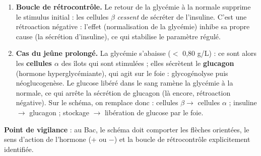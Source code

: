 \documentclass[11pt]{article}
\newcommand{\cle}[1]{{\popxbold\color{popdark}#1}}
\begin{document}
\begin{corrige}
\begin{enumerate}
\begin{popfigure}
\end{popfigure}
\item \textbf{Boucle de rétrocontrôle.} Le retour de la glycémie à la normale supprime le stimulus initial : les cellules $\beta$ \emph{cessent} de sécréter de l'insuline. C'est une \cle{rétroaction négative} : l'effet (normalisation de la glycémie) inhibe sa propre cause (la sécrétion d'insuline), ce qui stabilise le paramètre régulé.
\item \textbf{Cas du jeûne prolongé.} La glycémie s'abaisse ($<$ 0,80 g/L) : ce sont alors les \textbf{cellules $\alpha$} des îlots qui sont stimulées ; elles sécrètent le \textbf{glucagon} (hormone hyperglycémiante), qui agit sur le foie : glycogénolyse puis néoglucogenèse. Le glucose libéré dans le sang ramène la glycémie à la normale, ce qui arrête la sécrétion de glucagon (là encore, rétroaction négative). Sur le schéma, on remplace donc : cellules $\beta \to$ cellules $\alpha$ ; insuline $\to$ glucagon ; stockage $\to$ libération de glucose par le foie.
\end{enumerate}
\textbf{Point de vigilance} : au Bac, le schéma doit comporter les flèches orientées, le sens d'action de l'hormone (+ ou $-$) et la boucle de rétrocontrôle explicitement identifiée.
\end{corrige}
\end{document}
